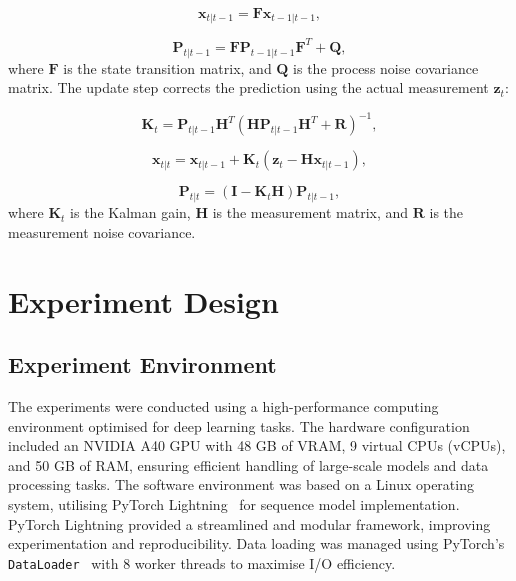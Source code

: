 \documentclass[12pt,oneside]{book} %
\begin{document}
\begin{equation}
    \mathbf{x}_{t|t-1} = \mathbf{F} \mathbf{x}_{t-1|t-1},
\end{equation}

\begin{equation}
    \mathbf{P}_{t|t-1} = \mathbf{F} \mathbf{P}_{t-1|t-1} \mathbf{F}^T + \mathbf{Q},
\end{equation}
where $\mathbf{F}$ is the state transition matrix, and $\mathbf{Q}$ is the
process noise covariance matrix. The update step corrects the prediction using the actual measurement
$\mathbf{z}_t$:

\begin{equation}
    \mathbf{K}_t = \mathbf{P}_{t|t-1} \mathbf{H}^T (\mathbf{H} \mathbf{P}_{t|t-1} \mathbf{H}^T + \mathbf{R})^{-1},
\end{equation}

\begin{equation}
    \mathbf{x}_{t|t} = \mathbf{x}_{t|t-1} + \mathbf{K}_t (\mathbf{z}_t - \mathbf{H} \mathbf{x}_{t|t-1}),
\end{equation}

\begin{equation}
    \mathbf{P}_{t|t} = (\mathbf{I} - \mathbf{K}_t \mathbf{H}) \mathbf{P}_{t|t-1},
\end{equation}
where $\mathbf{K}_t$ is the Kalman gain, $\mathbf{H}$ is the measurement
matrix, and $\mathbf{R}$ is the measurement noise covariance.

\chapter{Experiment Design}\label{chap:experiment_design}
\section{Experiment Environment}
The experiments were conducted using a high-performance computing environment
optimised for deep learning tasks. The hardware configuration included an
NVIDIA A40 GPU with 48 GB of VRAM, 9 virtual CPUs (vCPUs), and 50 GB of RAM,
ensuring efficient handling of large-scale models and data processing tasks.
The software environment was based on a Linux operating system, utilising
PyTorch Lightning~\cite{Falcon_PyTorch_Lightning_2019} for sequence model
implementation. PyTorch Lightning provided a streamlined and modular framework,
improving experimentation and reproducibility. Data loading was managed using
PyTorch's \texttt{DataLoader}~\cite{Ansel_PyTorch_2_Faster_2024} with 8 worker
threads to maximise I/O efficiency. 
\end{document}
